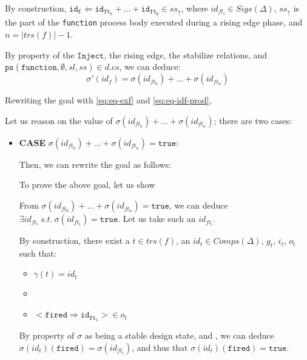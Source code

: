 \documentclass[dvipsnames,12pt]{article}
\begin{document}
\begin{niproof}
\begin{itemize}
    By construction,
    $\mathtt{id_f\Leftarrow{}id_{ft_0}+\dots+id_{ft_n}}\in{}ss_\uparrow$,
    where $id_{ft_i}\in{}Sigs(\Delta)$, $ss_\uparrow$ is the part of
    the \texttt{function} process body executed during a rising edge
    phase, and $n=\vert{}trs(f)\vert-1$.

    By property of the $\mathtt{Inject}$, the
    \hvhdl{} rising edge, the stabilize relations, and\\
    $\mathtt{ps}(\texttt{function}, \emptyset, sl, ss)\in{}d.cs$, we can
    deduce:
    \begin{equation}
      \sigma'(id_f)=\sigma(id_{ft_0})+\dots+\sigma(id_{ft_n})\label{eq:eq-idf-prod}
    \end{equation}

    Rewriting the goal with \eqref{eq:eq-exf} and
    \eqref{eq:eq-idf-prod},

    Let us reason on the value of
    $\sigma(id_{ft_0})+\dots+\sigma(id_{ft_n})$; there are two cases:

    \begin{itemize}
    \item \textbf{CASE} $\sigma(id_{ft_0})+\dots+\sigma(id_{ft_n})=\mathtt{true}$:
      
      Then, we can rewrite the goal as follows:

      To prove the above goal, let us show

      From $\sigma(id_{ft_0})+\dots+\sigma(id_{ft_n})=\mathtt{true}$,
      we can deduce
      $\exists{}id_{ft_i}~s.t.~\sigma(id_{ft_i})=\mathtt{true}$. Let
      us take such an $id_{ft_i}$.
      
      By construction, there exist a $t\in{}trs(f)$, an
      $id_t\in{}Comps(\Delta)$, $g_t$, $i_t$, $o_t$ such that:
      \begin{itemize}
      \item $\gamma(t)=id_t$
      \item \InCsCompT{}
      \item ${<}\mathtt{fired\Rightarrow{id_{ft_i}}}{>}\in{}o_{t}$
      \end{itemize}
      
      \noindent{}By property of $\sigma$ as being a stable design
      state, and \InCsCompT, we can deduce
      $\sigma(id_{t})(\texttt{fired})=\sigma(id_{ft_i})$, and thus that
      $\sigma(id_{t})(\texttt{fired})=\mathtt{true}$.


\end{itemize}
\end{itemize}
\end{niproof}
\end{document}
